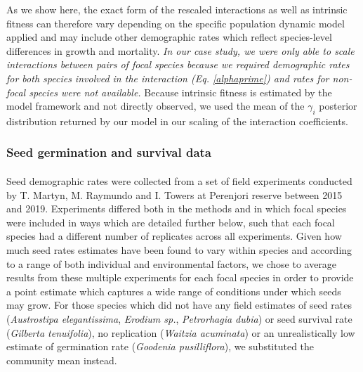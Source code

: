 \begin{refsection}
        As we show here, the exact form of the rescaled interactions as well as intrinsic fitness can therefore vary depending on the specific population dynamic model applied and may include other demographic rates which reflect species-level differences in growth and mortality. \textit{In our case study, we were only able to scale interactions between pairs of focal species because we required demographic rates for both species involved in the interaction (Eq. \ref{alphaprime}) and rates for non-focal species were not available.} Because intrinsic fitness is estimated by the model framework and not directly observed, we used the mean of the $\gamma_{i}$ posterior distribution returned by our model in our scaling of the interaction coefficients.


        \subsubsection{Seed germination and survival data}
        \label{SI:germination}

        \paragraph{}
        Seed demographic rates were collected from a set of field experiments conducted by T. Martyn, M. Raymundo and I. Towers at Perenjori reserve between 2015 and 2019. Experiments differed both in the methods and in which focal species were included in ways which are detailed further below, such that each focal species had a different number of replicates across all experiments. Given how much seed rates estimates have been found to vary within species and according to a range of both individual and environmental factors, we chose to average results from these multiple experiments for each focal species in order to provide a point estimate which captures a wide range of conditions under which seeds may grow. For those species which did not have any field estimates of seed rates (\textit{Austrostipa elegantissima}, \textit{Erodium sp.}, \textit{Petrorhagia dubia}) or seed survival rate (\textit{Gilberta tenuifolia}), no replication (\textit{Waitzia acuminata}) or an unrealistically low estimate of germination rate (\textit{Goodenia pusilliflora}), we substituted the community mean instead. 


\end{refsection}
